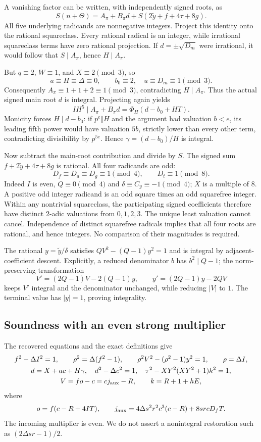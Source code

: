 A vanishing factor can be written, with independently signed roots, as
\[
 S(n+\Theta)=A_\pi+B_\pi d
             +S(2\widetilde y+f+4\tau+8g).
\]
All five underlying radicands are nonnegative integers. Project this
identity onto the rational squareclass. Every rational radical is an
integer, while irrational squareclass terms have zero rational
projection. If $d=\pm\sqrt{D_m}$ were irrational, it would follow that
$S\mid A_\pi$, hence $H\mid A_\pi$.

But $q\equiv2$, $W\equiv1$, and $X\equiv2\pmod3$, so
\[
 a\equiv H\equiv\Delta\equiv0,\qquad
 b_0\equiv2,\quad u\equiv D_m\equiv1\pmod3.
\]
Consequently $A_\pi\equiv1+1+2\equiv1\pmod3$, contradicting
$H\mid A_\pi$. Thus the actual signed main root $d$ is integral.
Projecting again yields
\[
 IH^5\mid A_\pi+B_\pi d=\Phi_H(d-b_0+HT).
\]
Monicity forces $H\mid d-b_0$: if $p^e\Vert H$ and the argument had
valuation $b<e$, its leading fifth power would have valuation $5b$,
strictly lower than every other term, contradicting divisibility by
$p^{5e}$. Hence $\gamma=(d-b_0)/H$ is integral.

Now subtract the main-root contribution and divide by $S$. The signed
sum $f+2\widetilde y+4\tau+8g$ is rational. All four radicands are odd:
\[
 D_f\equiv D_a\equiv D_g\equiv1\pmod4,
 \qquad D_t\equiv1\pmod8.
\]
Indeed $I$ is even, $Q\equiv0\pmod4$ and
$\delta\equiv C_y\equiv-1\pmod4$; $X$ is a multiple of $8$.
A positive odd integer radicand is an odd square times an odd squarefree
integer. Within any nontrivial squareclass, the participating signed
coefficients therefore have distinct $2$-adic valuations from
$0,1,2,3$. The unique least valuation cannot cancel. Independence of
distinct squarefree radicals implies that all four roots are rational,
and hence integers. No comparison of their magnitudes is required.

The rational $y=\widetilde y/\delta$ satisfies
$QV^2-(Q-1)y^2=1$ and is integral by adjacent-coefficient descent.
Explicitly, a reduced denominator $b$ has $b^2\mid Q-1$; the
norm-preserving transformation
\[
 V'=(2Q-1)V-2(Q-1)y,\qquad
 y'=(2Q-1)y-2QV
\]
keeps $V'$ integral and the denominator unchanged, while reducing
$|V|$ to $1$. The terminal value has $|y|=1$, proving integrality.

\subsection{Soundness with an even strong multiplier}

The recovered equations and the exact definitions give
\begin{gather*}
 f^2-\Delta I^2=1,\qquad
 \rho^2=\Delta(f^2-1),\qquad
 \rho^2V^2-(\rho^2-1)y^2=1,\qquad \rho=\Delta I,\\
 d=X+ac+H\gamma,\quad d^2-\Delta c^2=1,\quad
 \tau^2-XY^2(XY^2+1)k^2=1,\\
 V=fo-c=cj_{\rm aux}-R,\qquad k=R+1+hE,
\end{gather*}
where
\[
 o=f(c-R+4IT),\qquad
 j_{\rm aux}=4\Delta s^2r^2c^3(c-R)+8srcD_fT.
\]
The incoming multiplier is even. We do not assert a nonintegral
restoration such as $(2\Delta sr-1)/2$.


